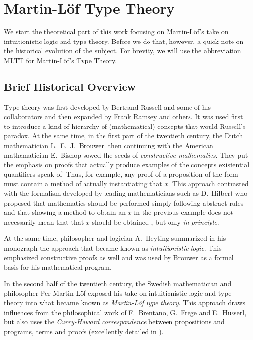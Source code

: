 
\chapter{Martin-L\"of Type Theory}
\label{ch:mltt}


We start the theoretical part of this work focusing on Martin-L\"of's take
on intuitionistic logic and type theory. Before we do that, however, a quick
note on the historical evolution of the subject. For brevity, we will
use the abbreviation MLTT for Martin-L\"of's Type Theory.

\section{Brief Historical Overview}
Type theory was first developed by Bertrand Russell and some of his
collaborators and then expanded by Frank Ramsey and others. It was used
first to introduce a kind of hierarchy of (mathematical) concepts
that would  Russell's paradox. At the same time, in the first
part of the twentieth century, the Dutch mathematician L.\ E.\ J.\ Brouwer,
then continuing with the American mathematician E.\ Bishop sowed the seeds
of \emph{constructive mathematics}. They put the emphasis on proofs that
actually produce examples of the concepts existential quantifiers speak of.
Thus, for example, any proof of a proposition of the form  must contain a method of actually instantiating that $ x $.
This approach contrasted with the formalism developed by leading mathematicians
such as D.\ Hilbert who proposed that mathematics should be performed
simply following abstract rules and that showing a method to obtain an $ x $
in the previous example does not necessarily mean that that $ x $ should be
obtained , but only \emph{in principle}.

At the same time, philosopher and logician A.\ Heyting summarized in his
monograph \cite{heyting} the approach that became known as
\emph{intuitionistic logic}. This emphasized constructive proofs as well
and was used by Brouwer as a formal basis for his mathematical program.

In the second half of the twentieth century, the Swedish mathematician and philosopher
Per Martin-L\"of exposed his take on intuitionistic logic and type theory
into what became known as \emph{Martin-L\"of type theory}. This approach
draws influences from the philosophical work of F.\ Brentano, G.\ Frege and
E.\ Husserl, but also uses the \emph{Curry-Howard correspondence} between
propositions and programs, terms and proofs (excellently detailed in \cite{ch}).

